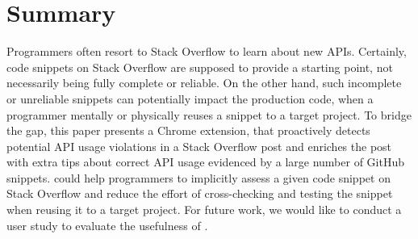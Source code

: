 \section{Summary}
\label{sec:summary}
Programmers often resort to Stack Overflow to learn about new APIs. Certainly, code snippets on Stack Overflow are supposed to provide a starting point, not necessarily being fully complete or reliable. On the other hand, such incomplete or unreliable snippets can potentially impact the production code, when a programmer mentally or physically reuses a snippet to a target project. 
To bridge the gap, this paper presents a Chrome extension, {\tool} that proactively detects potential API usage violations in a Stack Overflow post and enriches the post with extra tips about correct API usage evidenced by a large number of GitHub snippets. {\tool} could help programmers to implicitly assess a given code snippet on Stack Overflow and reduce the effort of cross-checking and testing the snippet when reusing it to a target project. For future work, we would like to conduct a user study to evaluate the usefulness of {\tool}.